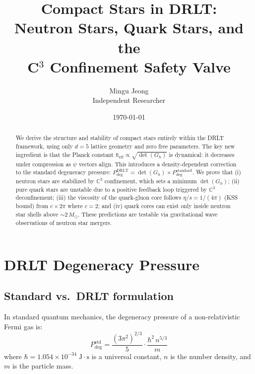 \documentclass[12pt]{article}
\theoremstyle{definition}
\theoremstyle{remark}
\begin{document}
\title{Compact Stars in DRLT:\\Neutron Stars, Quark Stars, and the\\C$^3$ Confinement Safety Valve}
\author{Mingu Jeong\\Independent Researcher}
\date{\today}
\maketitle

\begin{abstract}
We derive the structure and stability of compact stars entirely within the DRLT framework, using only $d = 5$ lattice geometry and zero free parameters. The key new ingredient is that the Planck constant $\hbar_\text{eff} \propto \sqrt{\det(G_h)}$ is dynamical: it decreases under compression as $\psi$ vectors align. This introduces a density-dependent correction to the standard degeneracy pressure: $P_\text{deg}^\text{DRLT} = \det(G_h) \times P_\text{deg}^\text{standard}$. We prove that (i) neutron stars are stabilized by $\mathbb{C}^3$ confinement, which sets a minimum $\det(G_h)$; (ii) pure quark stars are unstable due to a positive feedback loop triggered by $\mathbb{C}^3$ deconfinement; (iii) the viscosity of the quark-gluon core follows $\eta/s = 1/(4\pi)$ (KSS bound) from $c \times 2\pi$ where $c = 2$; and (iv) quark cores can exist only inside neutron star shells above $\sim 2\,M_\odot$. These predictions are testable via gravitational wave observations of neutron star mergers.
\end{abstract}

\tableofcontents

\section{DRLT Degeneracy Pressure}

\subsection{Standard vs.\ DRLT formulation}

In standard quantum mechanics, the degeneracy pressure of a non-relativistic Fermi gas is:
\begin{equation}
P_\text{deg}^\text{std} = \frac{(3\pi^2)^{2/3}}{5} \cdot \frac{\hbar^2\,n^{5/3}}{m}
\label{eq:Pstd}
\end{equation}
where $\hbar = 1.054 \times 10^{-34}\;\text{J}\cdot\text{s}$ is a universal constant, $n$ is the number density, and $m$ is the particle mass.
\end{document}
